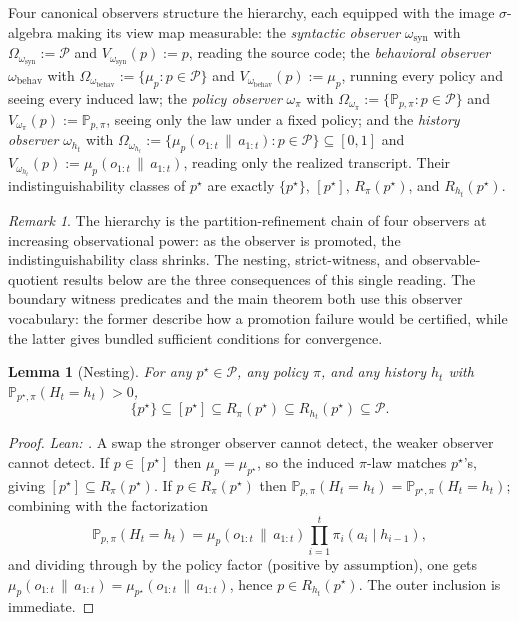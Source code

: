 \documentclass[11pt]{article}
\newtheorem{lemma}[theorem]{Lemma}
\theoremstyle{definition}
\theoremstyle{remark}
\newtheorem{remark}[theorem]{Remark}
\theoremstyle{plain}
\theoremstyle{definition}
\newcommand{\Pcal}{\mathcal{P}}
\newcommand{\Prob}{\mathbb{P}}
\newcommand{\givena}{\,\|\,}
\begin{document}
Four canonical observers structure the hierarchy, each equipped with the image $\sigma$-algebra making its view map measurable: the \emph{syntactic observer} $\omega_{\mathrm{syn}}$ with $\Omega_{\omega_{\mathrm{syn}}}:=\Pcal$ and $V_{\omega_{\mathrm{syn}}}(p):=p$, reading the source code; the \emph{behavioral observer} $\omega_{\mathrm{behav}}$ with $\Omega_{\omega_{\mathrm{behav}}}:=\{\mu_p:p\in\Pcal\}$ and $V_{\omega_{\mathrm{behav}}}(p):=\mu_p$, running every policy and seeing every induced law; the \emph{policy observer} $\omega_\pi$ with $\Omega_{\omega_\pi}:=\{\Prob_{p,\pi}:p\in\Pcal\}$ and $V_{\omega_\pi}(p):=\Prob_{p,\pi}$, seeing only the law under a fixed policy; and the \emph{history observer} $\omega_{h_t}$ with $\Omega_{\omega_{h_t}}:=\{\mu_p(o_{1:t}\givena a_{1:t}):p\in\Pcal\}\subseteq[0,1]$ and $V_{\omega_{h_t}}(p):=\mu_p(o_{1:t}\givena a_{1:t})$, reading only the realized transcript. Their indistinguishability classes of $p^\star$ are exactly $\{p^\star\}$, $[p^\star]$, $R_\pi(p^\star)$, and $R_{h_t}(p^\star)$.

\begin{remark}
\label{rem:four-observers}
The hierarchy is the partition-refinement chain of four observers at increasing observational power: as the observer is promoted, the indistinguishability class shrinks. The nesting, strict-witness, and observable-quotient results below are the three consequences of this single reading. The boundary witness predicates and the main theorem both use this observer vocabulary: the former describe how a promotion failure would be certified, while the latter gives bundled sufficient conditions for convergence.
\end{remark}

\begin{lemma}[Nesting]
\label{lem:nesting}
For any $p^\star\in\Pcal$, any policy $\pi$, and any history $h_t$ with $\Prob_{p^\star,\pi}(H_t=h_t)>0$,
\[
\{p^\star\}\subseteq [p^\star]\subseteq R_\pi(p^\star)\subseteq R_{h_t}(p^\star)\subseteq \Pcal.
\]
\end{lemma}

\begin{proof}
\noindent\emph{Lean: .}
A swap the stronger observer cannot detect, the weaker observer cannot detect. If $p\in[p^\star]$ then $\mu_p=\mu_{p^\star}$, so the induced $\pi$-law matches $p^\star$'s, giving $[p^\star]\subseteq R_\pi(p^\star)$. If $p\in R_\pi(p^\star)$ then $\Prob_{p,\pi}(H_t=h_t)=\Prob_{p^\star,\pi}(H_t=h_t)$; combining with the factorization
\[
\Prob_{p,\pi}(H_t=h_t)=\mu_p(o_{1:t}\givena a_{1:t})\prod_{i=1}^t \pi_i(a_i\mid h_{i-1}),
\]
and dividing through by the policy factor (positive by assumption), one gets $\mu_p(o_{1:t}\givena a_{1:t})=\mu_{p^\star}(o_{1:t}\givena a_{1:t})$, hence $p\in R_{h_t}(p^\star)$. The outer inclusion is immediate.
\end{proof}
\end{document}

